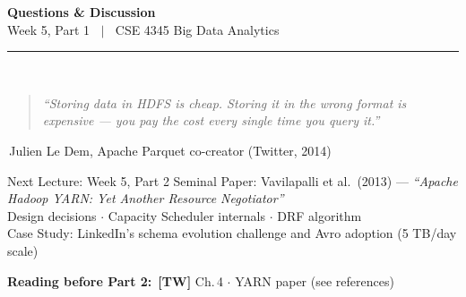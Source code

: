 \documentclass[aspectratio=169,10pt]{beamer}
\begin{document}
\begin{frame}[c]
  \begin{center}
    {\Large\bfseries Questions \& Discussion}\\[10pt]
    {\large Week 5, Part 1 $\;\mid\;$ CSE 4345 Big Data Analytics}\\[8pt]
    \textcolor{PUGray}{\rule{7cm}{0.5pt}}\\[10pt]
    \begin{quote}
      \itshape ``Storing data in HDFS is cheap.  Storing it in the \emph{wrong format} is expensive — you pay the cost every single time you query it.''
    \end{quote}
    \hfill\textemdash\,Julien Le Dem, Apache Parquet co-creator (Twitter, 2014)
    \vspace{12pt}
    \begin{block}{\centering Next Lecture: Week 5, Part 2}
      \centering
      Seminal Paper: Vavilapalli et al.\ (2013) --- \textit{``Apache Hadoop YARN: Yet Another Resource Negotiator''}\\[4pt]
      \small Design decisions $\cdot$ Capacity Scheduler internals $\cdot$ DRF algorithm\\
      Case Study: LinkedIn's schema evolution challenge and Avro adoption (5 TB/day scale)
    \end{block}
    \vspace{6pt}
    \textbf{Reading before Part 2:}\ \textbf{[TW]} Ch.\,4 $\cdot$ YARN paper (see references)
  \end{center}
\end{frame}

\end{document}
